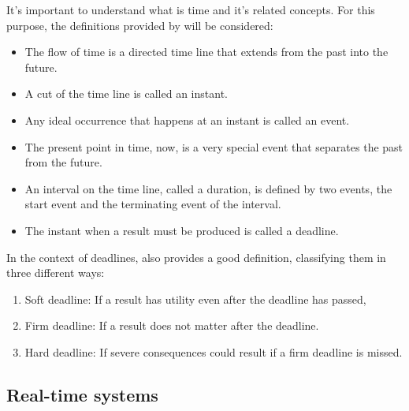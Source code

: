 \documentclass[12pt]{article}
\begin{document}
It's important to understand what is time and it's related concepts. For this purpose, the definitions provided by
\cite{kopetz2011real} will be considered: 
\begin{itemize}
 \item The flow of time is a directed time line that extends from the past into the future.
 \item A cut of the time line is called an instant.
 \item Any ideal occurrence that happens at an instant is called an event.
 \item The present point in time, now, is a very special event that separates the past from the future.
 \item An interval on the time line, called a duration, is defined by two events, the start event and the 
terminating event of the interval.
 \item The instant when a result must be produced is called a deadline.
\end{itemize}

In the context of deadlines, \cite{kopetz2011real} also provides a good definition, classifying them in 
three different ways:
\begin{enumerate}
 \item Soft deadline: If a result has utility even after the deadline has passed,
 \item Firm deadline: If a result does not matter after the deadline.
 \item Hard deadline: If severe consequences could result if a firm deadline is missed.
\end{enumerate}

\subsection{Real-time systems}

\end{document}

